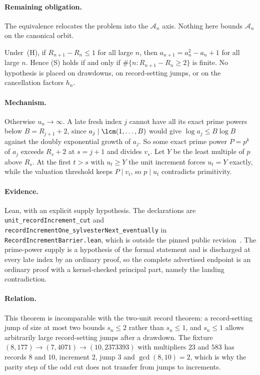 \paragraph{Remaining obligation.}
The equivalence relocates the problem into the $\mathcal A_n$ axis.  Nothing
here bounds $\mathcal A_n$ on the canonical orbit.

\begin{theorem}\label{long243:res:unitrecord}
Under~(H), if $R_{n+1}-R_n\le1$ for all large $n$, then $a_{n+1}=a_n^2-a_n+1$
for all large $n$.  Hence (S) holds if and only if
$\#\{n:R_{n+1}-R_n\ge2\}$ is finite.  No hypothesis is placed on drawdowns, on
record-setting jumps, or on the cancellation factors $h_n$.
\end{theorem}

\paragraph{Mechanism.}
Otherwise $u_n\to\infty$.  A late fresh index $j$ cannot have all its exact prime
powers below $B=R_{j+1}+2$, since $a_j\mid\lcm(1,\ldots,B)$ would give
$\log a_j\le B\log B$ against the doubly exponential growth of $a_j$.  So some
exact prime power $P=p^{k}$ of $a_j$ exceeds $R_s+2$ at $s=j+1$ and divides
$v_s$.  Let $Y$ be the least multiple of $p$ above $R_s$.  At the first $t>s$
with $u_t\ge Y$ the unit increment forces $u_t=Y$ exactly, while the valuation
threshold keeps $P\mid v_t$, so $p\mid u_t$ contradicts primitivity.

\paragraph{Evidence.}
Lean, with an explicit supply hypothesis.  The declarations are
\texttt{unit\_recordIncrement\_cut} and
\texttt{recordIncrementOne\_sylvesterNext\_eventually} in
\texttt{RecordIncrementBarrier.lean}, which is outside the pinned public
revision~\commitshort.  The prime-power supply is a hypothesis of the formal
statement and is discharged at every late index by an ordinary proof, so the
complete advertised endpoint is an ordinary proof with a kernel-checked
principal part, namely the landing contradiction.

\paragraph{Relation.}
This theorem is incomparable with the two-unit record theorem: a record-setting
jump of size at most two bounds $s_n\le2$ rather than $s_n\le1$, and $s_n\le1$
allows arbitrarily large record-setting jumps after a drawdown.  The fixture
$(8,177)\to(7,4071)\to(10,2373393)$ with multipliers $23$ and $583$ has records
$8$ and $10$, increment $2$, jump $3$ and $\gcd(8,10)=2$, which is why the
parity step of the odd cut does not transfer from jumps to increments.

